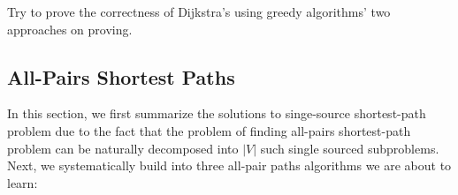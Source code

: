 \documentclass[../main.tex]{subfiles}
\begin{document}
\begin{bclogo}[couleur = blue!30, arrondi=0.1,logo=\bccrayon,ombre=true]{Try to prove the correctness of Dijkstra's using greedy algorithms' two approaches on proving.} 
\end{bclogo}




\subsection{All-Pairs Shortest Paths}
\label{sec_all_pairs_shortest_paths}
In this section, we first summarize the solutions to singe-source shortest-path problem due to the fact that the problem of finding all-pairs shortest-path problem can be naturally decomposed into $|V|$ such single sourced subproblems. Next, we systematically build into three all-pair paths algorithms we are about to learn: 
\end{document}
